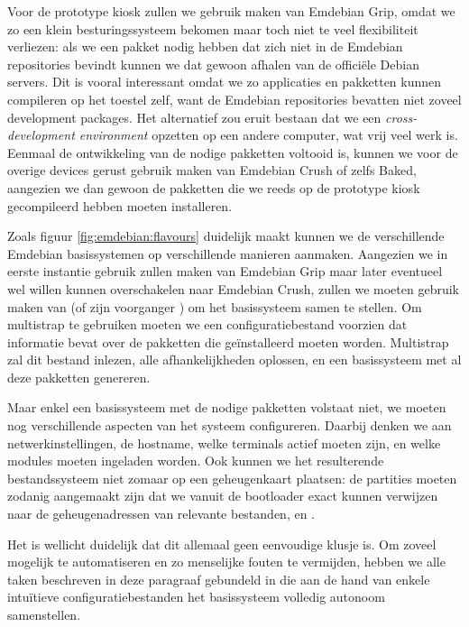 Voor de prototype kiosk zullen we gebruik maken van Emdebian Grip, omdat we zo een klein besturingssysteem bekomen maar toch niet te veel flexibiliteit verliezen: als we een pakket nodig hebben dat zich niet in de Emdebian repositories bevindt kunnen we dat gewoon afhalen van de officiële Debian servers. Dit is vooral interessant omdat we zo applicaties en pakketten kunnen compileren op het toestel zelf, want de Emdebian repositories bevatten niet zoveel development packages. Het alternatief zou eruit bestaan dat we een \emph{cross-development environment} opzetten op een andere computer, wat vrij veel werk is.
Eenmaal de ontwikkeling van de nodige pakketten voltooid is, kunnen we voor de overige devices gerust gebruik maken van Emdebian Crush of zelfs Baked, aangezien we dan gewoon de pakketten die we reeds op de prototype kiosk gecompileerd hebben moeten installeren.

Zoals figuur \ref{fig:emdebian:flavours} duidelijk maakt kunnen we de verschillende Emdebian basissystemen op verschillende manieren aanmaken. Aangezien we in eerste instantie gebruik zullen maken van Emdebian Grip maar later eventueel wel willen kunnen overschakelen naar Emdebian Crush, zullen we moeten gebruik maken van  (of zijn voorganger ) om het basissysteem samen te stellen. Om multistrap te gebruiken moeten we een configuratiebestand voorzien dat informatie bevat over de pakketten die geïnstalleerd moeten worden. Multistrap zal dit bestand inlezen, alle afhankelijkheden oplossen, en een basissysteem met al deze pakketten genereren.

Maar enkel een basissysteem met de nodige pakketten volstaat niet, we moeten nog verschillende aspecten van het systeem configureren. Daarbij denken we aan netwerkinstellingen, de hostname, welke terminals actief moeten zijn, en welke modules moeten ingeladen worden. Ook kunnen we het resulterende bestandssysteem niet zomaar op een geheugenkaart plaatsen: de partities moeten zodanig aangemaakt zijn dat we vanuit de bootloader exact kunnen verwijzen naar de geheugenadressen van relevante bestanden,  en .

Het is wellicht duidelijk dat dit allemaal geen eenvoudige klusje is. Om zoveel mogelijk te automatiseren en zo menselijke fouten te vermijden, hebben we alle taken beschreven in deze paragraaf gebundeld in  die aan de hand van enkele intuïtieve configuratiebestanden het basissysteem volledig autonoom samenstellen.


